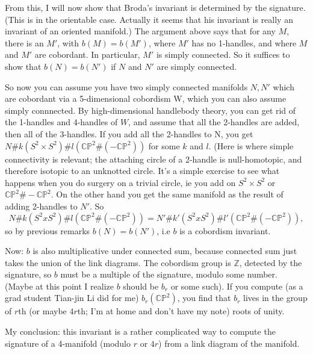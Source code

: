 \documentclass{article}
\begin{document}
From this, I will now show that Broda's invariant is determined by the
signature. (This is in the orientable case. Actually it seems that his
invariant is really an invariant of an oriented manifold.) The argument
above says that for any \(M\), there is an \(M'\), with
\(b(M) = b(M')\), where \(M'\) has no 1-handles, and where \(M\) and
\(M'\) are cobordant. In particular, \(M'\) is simply connected. So it
suffices to show that \(b(N) = b(N')\) if \(N\) and \(N'\) are simply
connected.

So now you can assume you have two simply connected manifolds \(N,N'\)
which are cobordant via a 5-dimensional cobordism W, which you can also
assume simply connnected. By high-dimensional handlebody theory, you can
get rid of the 1-handles and 4-handles of \(W\), and assume that all the
2-handles are added, then all of the 3-handles. If you add all the
2-handles to N, you get
\(N\#k(S^2 \times S^2)\#l(\mathbb{CP}^2\#(-\mathbb{CP}^2))\) for some
\(k\) and \(l\). (Here is where simple connectivity is relevant; the
attaching circle of a 2-handle is null-homotopic, and therefore isotopic
to an unknotted circle. It's a simple exercise to see what happens when
you do surgery on a trivial circle, ie you add on \(S^2 \times S^2\) or
\(\mathbb{CP}^2 \# -\mathbb{CP}^2\). On the other hand you get the same
manifold as the result of adding 2-handles to \(N'\). So
\[N\#k(S^2 x S^2)\#l(\mathbb{CP}^2\#(-\mathbb{CP}^2)) = N'\#k'(S^2 x S^2)\#l'(\mathbb{CP}^2\#(-\mathbb{CP}^2)),\]
so by previous remarks \(b(N) = b(N')\), i.e \(b\) is a cobordism
invariant.

Now: \(b\) is also multiplicative under connected sum, because connected
sum just takes the union of the link diagrams. The cobordism group is
\(\mathbb{Z}\), detected by the signature, so \(b\) must be a multiple
of the signature, modulo some number. (Maybe at this point I realize
\(b\) should be \(b_r\) or some such). If you compute (as a grad student
Tian-jin Li did for me) \(b_r(\mathbb{CP}^2)\), you find that \(b_r\)
lives in the group of \(r\)th (or maybe \(4r\)th; I'm at home and don't
have my note) roots of unity.

My conclusion: this invariant is a rather complicated way to compute the
signature of a 4-manifold (modulo \(r\) or \(4r\)) from a link diagram
of the manifold.
\end{document}
